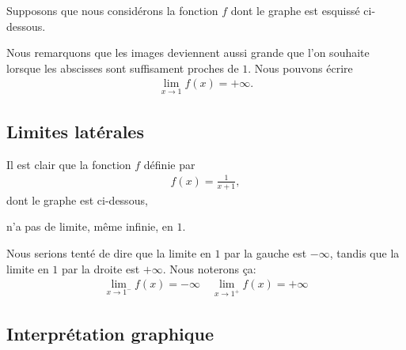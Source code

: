\documentclass[main.tex]{subfiles}
\begin{document}
\begin{example}

    Supposons que nous considérons la fonction $f$ dont le graphe est esquissé ci-dessous.

    \begin{center}
        \begin{plot}{0.5}{-6}{-1}{6}{12}
        \end{plot}
    \end{center}

    Nous remarquons que les images deviennent aussi grande que l'on souhaite
    lorsque les abscisses sont suffisament proches de $1$.
    Nous pouvons écrire
    \begin{align}
        \lim_{x \to 1} f(x) = +\infty.
    \end{align}
\end{example}

\subsection{Limites latérales}

\begin{example}

    Il est clair que la fonction $f$ définie par
    \begin{align}
        f(x) = \frac 1 {x + 1},
    \end{align}
    dont le graphe est ci-dessous,
    \begin{center}
        \begin{plot}{0.5}{-6}{-6}{6}{6}
        \end{plot}
    \end{center}
    n'a pas de limite, même infinie, en $1$.

    Nous serions tenté de dire que la limite en $1$ par la gauche est $-\infty$,
    tandis que la limite en $1$ par la droite est $+\infty$.
    Nous noterons ça:
    \begin{align}
        \lim_{x \to 1^-} f(x) = -\infty
        \quad
        \lim_{x \to 1^+} f(x) = +\infty
    \end{align}
\end{example}

\subsection{Interprétation graphique}
\end{document}
